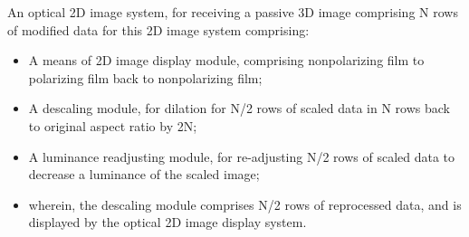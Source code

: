 \documentclass[english]{uspatent}
\begin{document}









\patentClaimsStart

An optical 2D image system, for receiving a passive 3D image  comprising N rows of modified data for this 2D image system comprising: \\
\begin{itemize}[label={}]
\item A means of 2D image display module, comprising nonpolarizing film to polarizing film back to nonpolarizing film; 

\item A descaling module, for dilation for N/2 rows of scaled data in N rows back to original aspect ratio by 2N; 
\item A luminance readjusting module, for re-adjusting N/2 rows of scaled data to decrease a luminance of the scaled image;

\item wherein, the descaling module comprises N/2 rows of reprocessed data, and is displayed by the optical 2D image display system. \\
\end{itemize}
\end{document}
